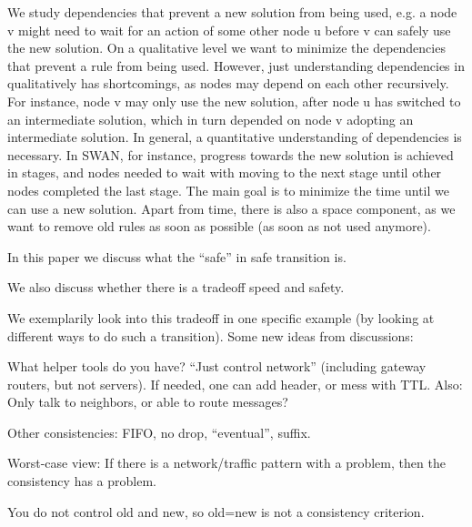 We study dependencies that prevent a new solution from being used, e.g. a node v might need to wait for an action of some other node u before v can safely use the new solution. On a qualitative level we want to minimize the dependencies that prevent a rule from being used. However, just understanding dependencies in qualitatively has shortcomings, as nodes may depend on each other recursively. For instance, node v may only use the new solution, after node u has switched to an intermediate solution, which in turn depended on node v adopting an intermediate solution. In general, a quantitative understanding of dependencies is necessary. In SWAN, for instance, progress towards the new solution is achieved in stages, and nodes needed to wait with moving to the next stage until other nodes completed the last stage. The main goal is to minimize the time until we can use a new solution. Apart from time, there is also a space component, as we want to remove old rules as soon as possible (as soon as not used anymore).

In this paper we discuss what the ``safe'' in safe transition is.

We also discuss whether there is a tradeoff speed and safety.

We exemplarily look into this tradeoff in one specific example (by looking at different ways to do such a transition).
Some new ideas from discussions:

What helper tools do you have? ``Just control network'' (including gateway routers, but not servers). If needed, one can add header, or mess with TTL. Also: Only talk to neighbors, or able to route messages?

Other consistencies: FIFO, no drop, ``eventual'', suffix.

Worst-case view: If there is a network/traffic pattern with a problem, then the consistency has a problem.

You do not control old and new, so old=new is not a consistency criterion.


